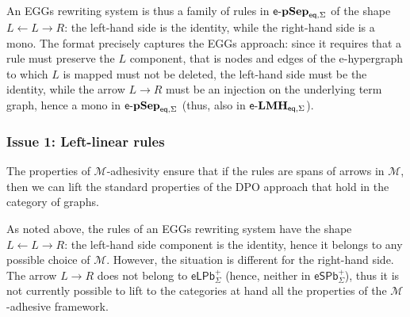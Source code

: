 \documentclass[3p]{elsarticle}
\newcommand{\epbl}{\mathsf{eLPb}^{+}}
\newcommand{\epbs}{\mathsf{eSPb}^{+}}
\newcommand{\eq}{\mathsf{eq}}
\newcommand{\catname}[1]{\textbf{\textup{#1}}}
\newcommand{\lelmBis}{\mathsf{e}\text{-}\catname{LMH}_{\eq, \Sigma}}
\newcommand{\lepsBis}{\mathsf{e}\text{-}\catname{pSep}_{\eq, \Sigma}}
\theoremstyle{remark}
\theoremstyle{definition}
\begin{document}
An EGGs rewriting system is thus a family of rules in $\lepsBis$ of the shape
$L \leftarrow L \rightarrow R$: the left-hand side is the identity,
while the right-hand side is a mono. The format precisely 
captures the EGGs approach: since it requires that a rule must preserve the $L$ component, 
that is nodes and edges of the e-hypergraph to which $L$ is mapped must not be deleted, 
the left-hand side must be the identity, while the arrow $L \rightarrow R$ must be an injection
on the underlying term graph, hence a mono in $\lepsBis$ (thus, also in $\lelmBis$). 


\subsubsection{Issue 1: Left-linear rules}

The properties of $\mathcal{M}$-adhesivity ensure that if the rules are spans of 
arrows in $\mathcal{M}$, then we can lift the standard properties
of the DPO approach that hold in the category of graphs.

As noted above, the rules of an EGGs rewriting system have the shape
$L \leftarrow L \rightarrow R$: the left-hand side component is the identity,
hence it belongs to any possible choice of $\mathcal{M}$. 
However, the situation is different for the right-hand side.
The arrow $L \rightarrow R$ does not  belong to $\epbl_{\Sigma}$ 
(hence,  neither in $\epbs_{\Sigma}$), thus it is not currently possible 
to lift to the categories at hand all the properties of the $\mathcal{M}$-adhesive framework.
\end{document}
